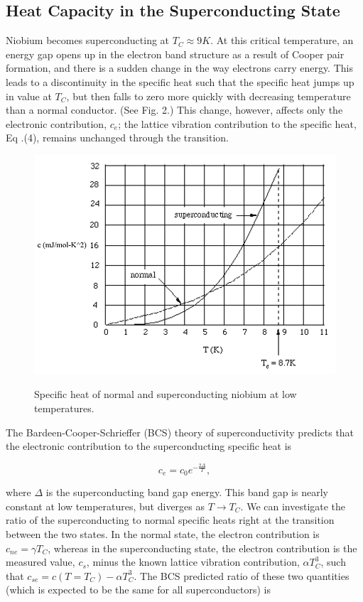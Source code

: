\documentclass{article}
\begin{document}
\subsection{Heat Capacity in the Superconducting State}

Niobium becomes superconducting at $T_C \approx 9 K$. At this critical temperature, an energy gap opens up in the electron band structure as a result of Cooper pair formation, and there is a sudden change in the way electrons carry energy. This leads to a discontinuity in the specific heat such that the specific heat jumps up in value at $T_C$, but then falls to zero more quickly with decreasing temperature than a normal conductor. (See Fig. 2.) This change, however, affects only the electronic contribution, $c_e$; the lattice vibration contribution to the specific heat, Eq .(4), remains unchanged through the transition. \cite{lab manual}

\begin{figure}[!htb]
	\centering
	\includegraphics[scale=.5]{plots/fig_2.png}
 	\label{super}
	\caption{Specific heat of normal and superconducting niobium at low temperatures. \cite{lab manual}}
\end{figure}

The Bardeen-Cooper-Schrieffer (BCS) theory of superconductivity predicts that the electronic contribution to the superconducting specific heat is

\begin{equation}
	c_e =  c_0 e^{-\frac{2 \Delta}{T}},
\end{equation}

where $\Delta$ is the superconducting band gap energy. This band gap is nearly constant at low temperatures, but diverges as $T \rightarrow T_C$. We can investigate the ratio of the superconducting to normal specific heats right at the transition between the two states. In the normal state, the electron contribution is $c_{ne} = \gamma T_C$, whereas in the superconducting state, the electron contribution is the measured value, $c_s$, minus the known lattice vibration contribution, $\alpha T_C^3$, such that $c_{se} = c(T = T_C) - \alpha T_C^3$. The BCS predicted ratio of these two quantities (which is expected to be the same for all superconductors) is
\end{document}
